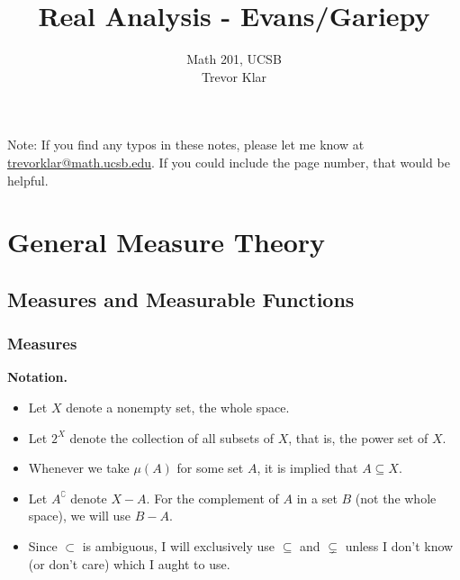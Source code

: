 \documentclass[a5paper]{article}
\title{Real Analysis - Evans/Gariepy}
\author{Math 201, UCSB \\ Trevor Klar}
\theoremstyle{definition}%
\numberwithin{exercise}{section}
\theoremstyle{remark}%
\begin{document}
\maketitle

\tableofcontents



\begin{highlight}
Note: If you find any typos in these notes, please let me know at \\ \href{mailto:trevorklar@math.ucsb.edu}{trevorklar@math.ucsb.edu}. If you could include the page number, that would be helpful. 

\end{highlight}

\pagebreak
\section{General Measure Theory}
\subsection{Measures and Measurable Functions}
\subsubsection{Measures}

\textbf{Notation.}
\begin{itemize}
\item Let $X$ denote a nonempty set, the whole space.
\item Let $2^X$ denote the collection of all subsets of $X$, that is, the power set of $X$.
\item Whenever we take $\mu(A)$ for some set $A$, it is implied that $A\subseteq X$. 
\item Let $A^\complement$ denote $X-A$. For the complement of $A$ in a set $B$ (not the whole space), we will use $B-A$.
\item Since $\subset$ is ambiguous, I will exclusively use $\subseteq$ and $\subsetneq$ unless I don't know (or don't care) which I aught to use.
\end{itemize}
\end{document}
